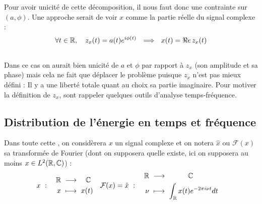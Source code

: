 Pour avoir unicité de cette décomposition, il nous faut donc une contrainte sur $(a,\phi)$. Une approche serait de voir $x$ comme la partie réelle du signal complexe :
\[\forall t\in\R,\quad z_x(t) = a(t)e^{i\phi(t)}\ \ \Lr\ \ x(t) = \Re e\, z_x(t)\]
\\
Dans ce cas on aurait bien unicité de $a$ et $\phi$ par rapport à $z_x$ (son amplitude et sa phase) mais cela ne fait que déplacer le problème puisque $z_x$ n'est pas mieux défini : Il y a une liberté totale quant au choix sa partie imaginaire. Pour motiver la définition de $z_x$, sont rappeler quelques outils d'analyse temps-fréquence.



\subsection{Distribution de l'énergie en temps et fréquence}\label{subsec:distrib_temp-freq}

Dans toute cette , on considèrera $x$ un signal complexe et on notera $\hat{x}$ ou $\mathcal{F}(x)$ sa transformée de Fourier (dont on supposera quelle existe, ici on supposera au moins $x\in L^2(\mathbb{R}, \mathbb{C})$) :
\begin{align*}
	x\ &:\quad \begin{aligned}\R\ &\lr\quad \C \\ x\ &\longmapsto\ x(t)
	\end{aligned}  &  \mathcal{F}(x)=\hat{x}\ &:\quad \begin{aligned}\R\ &\lr\qquad\quad \C \\ \nu\ &\longmapsto\ \int_\R x(t)e^{-2\pi i \nu t}dt
	\end{aligned}
\end{align*}
\\

